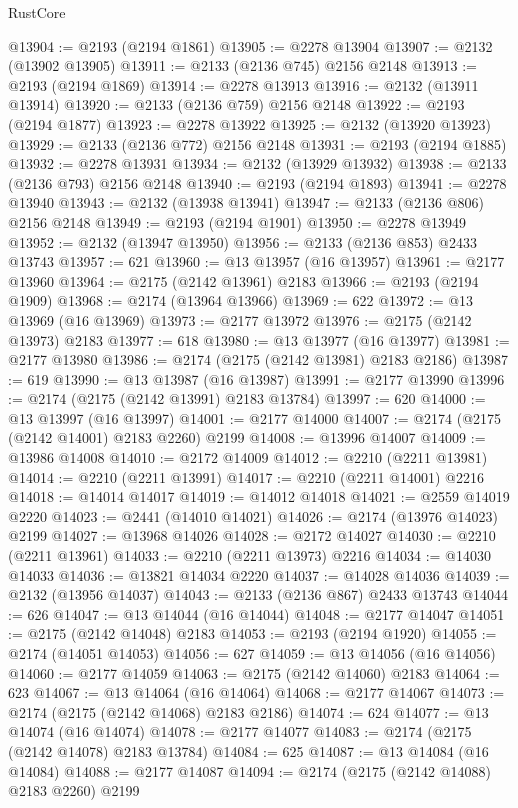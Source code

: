 \begin{lexlean}{RustCore}
\begin{coremodule}
@13904 := @2193 (@2194 @1861)
@13905 := @2278 @13904
@13907 := @2132 (@13902 @13905)
@13911 := @2133 (@2136 @745) @2156 @2148
@13913 := @2193 (@2194 @1869)
@13914 := @2278 @13913
@13916 := @2132 (@13911 @13914)
@13920 := @2133 (@2136 @759) @2156 @2148
@13922 := @2193 (@2194 @1877)
@13923 := @2278 @13922
@13925 := @2132 (@13920 @13923)
@13929 := @2133 (@2136 @772) @2156 @2148
@13931 := @2193 (@2194 @1885)
@13932 := @2278 @13931
@13934 := @2132 (@13929 @13932)
@13938 := @2133 (@2136 @793) @2156 @2148
@13940 := @2193 (@2194 @1893)
@13941 := @2278 @13940
@13943 := @2132 (@13938 @13941)
@13947 := @2133 (@2136 @806) @2156 @2148
@13949 := @2193 (@2194 @1901)
@13950 := @2278 @13949
@13952 := @2132 (@13947 @13950)
@13956 := @2133 (@2136 @853) @2433 @13743
@13957 := 621
@13960 := @13 @13957 (@16 @13957)
@13961 := @2177 @13960
@13964 := @2175 (@2142 @13961) @2183
@13966 := @2193 (@2194 @1909)
@13968 := @2174 (@13964 @13966)
@13969 := 622
@13972 := @13 @13969 (@16 @13969)
@13973 := @2177 @13972
@13976 := @2175 (@2142 @13973) @2183
@13977 := 618
@13980 := @13 @13977 (@16 @13977)
@13981 := @2177 @13980
@13986 := @2174 (@2175 (@2142 @13981) @2183 @2186)
@13987 := 619
@13990 := @13 @13987 (@16 @13987)
@13991 := @2177 @13990
@13996 := @2174 (@2175 (@2142 @13991) @2183 @13784)
@13997 := 620
@14000 := @13 @13997 (@16 @13997)
@14001 := @2177 @14000
@14007 := @2174 (@2175 (@2142 @14001) @2183 @2260) @2199
@14008 := @13996 @14007
@14009 := @13986 @14008
@14010 := @2172 @14009
@14012 := @2210 (@2211 @13981)
@14014 := @2210 (@2211 @13991)
@14017 := @2210 (@2211 @14001) @2216
@14018 := @14014 @14017
@14019 := @14012 @14018
@14021 := @2559 @14019 @2220
@14023 := @2441 (@14010 @14021)
@14026 := @2174 (@13976 @14023) @2199
@14027 := @13968 @14026
@14028 := @2172 @14027
@14030 := @2210 (@2211 @13961)
@14033 := @2210 (@2211 @13973) @2216
@14034 := @14030 @14033
@14036 := @13821 @14034 @2220
@14037 := @14028 @14036
@14039 := @2132 (@13956 @14037)
@14043 := @2133 (@2136 @867) @2433 @13743
@14044 := 626
@14047 := @13 @14044 (@16 @14044)
@14048 := @2177 @14047
@14051 := @2175 (@2142 @14048) @2183
@14053 := @2193 (@2194 @1920)
@14055 := @2174 (@14051 @14053)
@14056 := 627
@14059 := @13 @14056 (@16 @14056)
@14060 := @2177 @14059
@14063 := @2175 (@2142 @14060) @2183
@14064 := 623
@14067 := @13 @14064 (@16 @14064)
@14068 := @2177 @14067
@14073 := @2174 (@2175 (@2142 @14068) @2183 @2186)
@14074 := 624
@14077 := @13 @14074 (@16 @14074)
@14078 := @2177 @14077
@14083 := @2174 (@2175 (@2142 @14078) @2183 @13784)
@14084 := 625
@14087 := @13 @14084 (@16 @14084)
@14088 := @2177 @14087
@14094 := @2174 (@2175 (@2142 @14088) @2183 @2260) @2199

\end{coremodule}
\end{lexlean}
